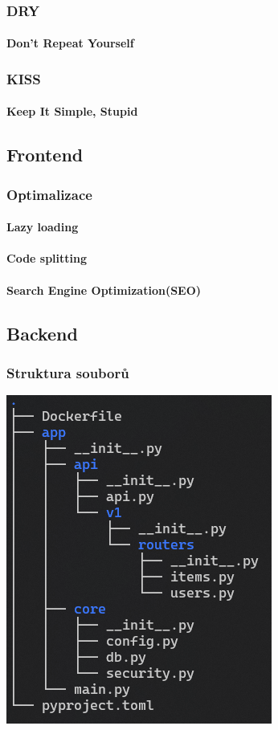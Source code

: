 \documentclass[12pt, a4paper]{article}
\begin{document}
\subsubsection{DRY}
\paragraph{Don't Repeat Yourself}
\subsubsection{KISS}
\paragraph{Keep It Simple, Stupid}
\subsection{Frontend}
\subsubsection{Optimalizace}
\paragraph{Lazy loading}
\paragraph{Code splitting}
\paragraph{Search Engine Optimization(SEO)}
\subsection{Backend}
\subsubsection{Struktura souborů}
\includegraphics{images/backend-tree.png}
\end{document}
